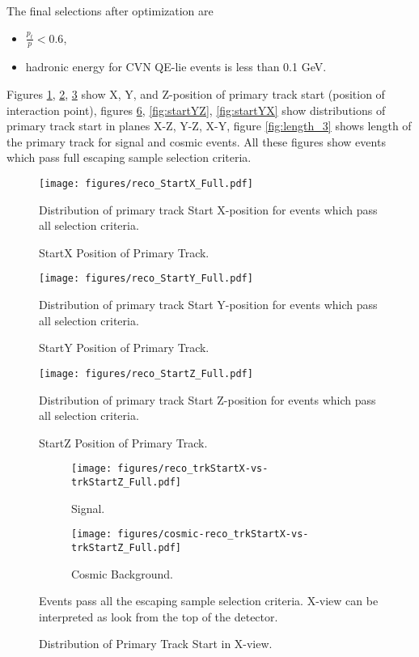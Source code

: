 The final selections after optimization are
\begin{itemize}
\item $\frac{p_t}{p} < 0.6$,
\item hadronic energy for CVN QE-lie events is less than 0.1 GeV.
\end{itemize}
Figures \ref{fig:startx}, \ref{fig:starty}, \ref{fig:startz} show X, Y, and Z-position of primary track start 
(position of interaction point), figures \ref{fig:startXZ}, \ref{fig:startYZ}, \ref{fig:startYX}  show distributions 
of primary track start in planes X-Z, Y-Z, X-Y, figure \ref{fig:length_3} shows length of the primary track for 
signal and cosmic events. All these figures show events which pass full escaping sample selection criteria. 

\begin{figure}[!th]
\centering
\texttt{[image: figures/reco\_StartX\_Full.pdf]}
\caption{StartX Position of Primary Track.}
{Distribution of primary track Start X-position for events which pass all selection criteria.  }
\label{fig:startx}
\end{figure}

\begin{figure}[!th]
\centering
\texttt{[image: figures/reco\_StartY\_Full.pdf]}
\caption{StartY Position of Primary Track.}
{Distribution of primary track Start Y-position for events which pass all selection criteria.  }
\label{fig:starty}
\end{figure}

\begin{figure}[!th]
\centering
\texttt{[image: figures/reco\_StartZ\_Full.pdf]}
\caption{StartZ Position of Primary Track.}
{Distribution of primary track Start Z-position for events which pass all selection criteria.  }
\label{fig:startz}
\end{figure}

\begin{figure}[!th]
\centering
\begin{subfigure}[t]{0.95\textwidth}
  \centering
  \texttt{[image: figures/reco\_trkStartX-vs-trkStartZ\_Full.pdf]}
  \caption{Signal.}
  \label{fig:startXZ_sig}
\end{subfigure}
\vspace{0.5cm}
\newline
\begin{subfigure}[t]{0.95\textwidth}
  \centering
  \texttt{[image: figures/cosmic-reco\_trkStartX-vs-trkStartZ\_Full.pdf]}
  \caption{Cosmic Background.}
  \label{fig:startXZ_bkg}
\end{subfigure}
\caption{ Distribution of Primary Track Start in X-view.}
{ Events pass all the escaping sample selection criteria. X-view can be interpreted as look from the top of the detector. }
\label{fig:startXZ}
\end{figure}

